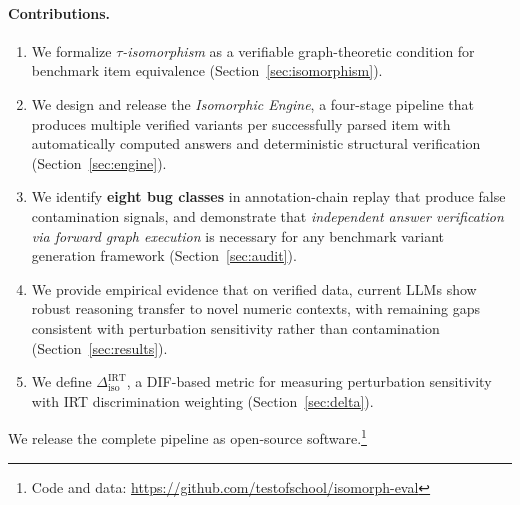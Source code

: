 \paragraph{Contributions.}
\begin{enumerate}[leftmargin=*, nosep]
\item We formalize \emph{$\tau$-isomorphism} as a verifiable
graph-theoretic condition for benchmark item equivalence
(Section~\ref{sec:isomorphism}).

\item We design and release the \emph{Isomorphic Engine}, a
four-stage pipeline that produces multiple verified variants per successfully parsed item with
automatically computed answers and deterministic structural
verification (Section~\ref{sec:engine}).

\item We identify \textbf{eight bug classes} in annotation-chain
replay that produce false contamination signals, and demonstrate that
\emph{independent answer verification via forward graph execution} is
necessary for any benchmark variant generation framework
(Section~\ref{sec:audit}).

\item We provide empirical evidence that on verified data, current
LLMs show robust reasoning transfer to novel numeric contexts, with
remaining gaps consistent with perturbation sensitivity rather than
contamination (Section~\ref{sec:results}).

\item We define $\Delta_{\mathrm{iso}}^{\mathrm{IRT}}$, a
DIF-based metric for measuring perturbation sensitivity with IRT
discrimination weighting (Section~\ref{sec:delta}).
\end{enumerate}

\noindent We release the complete pipeline as open-source
software.\footnote{Code and data:
\url{https://github.com/testofschool/isomorph-eval}}
